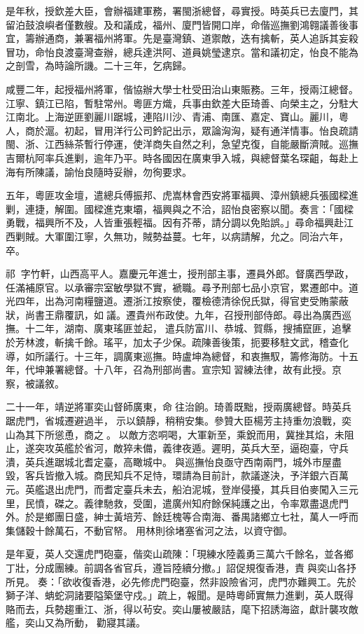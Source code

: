 \begin{pinyinscope}
是年秋，授欽差大臣，會辦福建軍務，署閩浙總督，尋實授。時英兵已去廈門，其留泊鼓浪嶼者僅數艘。及和議成，福州、廈門皆開口岸，命偕巡撫劉鴻翱議善後事宜，籌辦通商，兼署福州將軍。先是臺灣鎮、道禦敵，迭有擒斬，英人追訴其妄殺冒功，命怡良渡臺灣查辦，總兵達洪阿、道員姚瑩逮京。當和議初定，怡良不能為之剖雪，為時論所譏。二十三年，乞病歸。

咸豐二年，起授福州將軍，偕協辦大學士杜受田治山東賑務。三年，授兩江總督。江寧、鎮江已陷，暫駐常州。粵匪方熾，兵事由欽差大臣琦善、向榮主之，分駐大江南北。上海逆匪劉麗川踞城，連陷川沙、青浦、南匯、嘉定、寶山。麗川，粵人，商於滬。初起，冒用洋行公司鈐記出示，眾論洶洶，疑有通洋情事。怡良疏請閩、浙、江西絲茶暫行停運，使洋商失自然之利，急望克復，自能嚴斷濟賊。巡撫吉爾杭阿率兵進剿，逾年乃平。時各國因在廣東爭入城，與總督葉名琛齟，每赴上海有所陳議，諭怡良隨時妥辦，勿徇要求。

五年，粵匪攻金壇，遣總兵傅振邦、虎嵩林會西安將軍福興、漳州鎮總兵張國樑進剿，連捷，解圍。國樑進克東壩，福興與之不洽，詔怡良密察以聞。奏言：「國樑勇戰，福興所不及，人皆重張輕福。因有芥蒂，請分調以免貽誤。」尋命福興赴江西剿賊。大軍圍江寧，久無功，賊勢益蔓。七年，以病請解，允之。同治六年，卒。

祁，字竹軒，山西高平人。嘉慶元年進士，授刑部主事，遷員外郎。督廣西學政，任滿補原官。以承審宗室敏學獄不實，褫職。尋予刑部七品小京官，累遷郎中。道光四年，出為河南糧鹽道。遷浙江按察使，覆檢德清徐倪氏獄，得官吏受賄蒙蔽狀，尚書王鼎覆訊，如議。遷貴州布政使。九年，召授刑部侍郎。尋出為廣西巡撫。十二年，湖南、廣東瑤匪並起，遣兵防富川、恭城、賀縣，搜捕竄匪，追擊於芳林渡，斬擒千餘。瑤平，加太子少保。疏陳善後策，扼要移駐文武，稽查化導，如所議行。十三年，調廣東巡撫。時盧坤為總督，和衷撫馭，籌修海防。十五年，代坤兼署總督。十八年，召為刑部尚書。宣宗知習練法律，故有此授。京察，被議敘。

二十一年，靖逆將軍奕山督師廣東，命往治餉。琦善既黜，授兩廣總督。時英兵踞虎門，省城遷避過半，示以鎮靜，稍稍安集。參贊大臣楊芳主持重勿浪戰，奕山為其下所慫恿，商之。以敵方恣哃喝，大軍新至，乘銳而用，冀挫其焰，未阻止，遂突攻英艦於省河，敵猝未備，義律夜遁。遲明，英兵大至，逼砲臺，守兵潰，英兵進踞城北耆定臺，高瞰城中。與巡撫怡良亟守西南兩門，城外市屋盡毀，客兵皆撤入城。商民知兵不足恃，環請為目前計，款議遂決，予洋銀六百萬元。英艦退出虎門，而耆定臺兵未去，船泊泥城，登岸侵擾，其兵目伯麥闖入三元里，民憤，磔之。義律馳救，受圍，遣廣州知府餘保純護之出，令率眾盡退虎門外。於是鄉團日盛，紳士黃培芳、餘廷槐等合南海、番禺諸鄉立七社，萬人一呼而集儲穀十餘萬石，不動官帑。用林則徐堵塞省河之法，以資守御。

是年夏，英人交還虎門砲臺，偕奕山疏陳：「現練水陸義勇三萬六千餘名，並各鄉丁壯，分成團練。前調各省官兵，遵旨陸續分撤。」詔促規復香港，責與奕山各抒所見。奏：「欲收復香港，必先修虎門砲臺，然非設險省河，虎門亦難興工。先於獅子洋、蚺蛇洞諸要隘築堡守戍。」疏上，報聞。是時粵師實無力進剿，英人既得賂而去，兵勢趨重江、浙，得以茍安。奕山屢被嚴詰，麾下招誘海盜，獻計襲攻敵艦，奕山又為所動，勸寢其議。


\end{pinyinscope}
